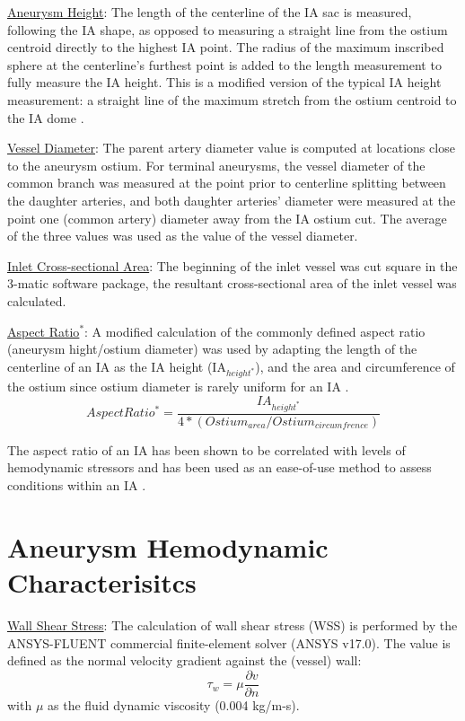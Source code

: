 \underline{Aneurysm Height}: The length of the centerline of the IA sac is measured, following the IA shape, as opposed to measuring a straight line from the ostium centroid directly to the highest IA point. The radius of the maximum inscribed sphere at the centerline's furthest point is added to the length measurement to fully measure the IA height. This is a modified version of the typical IA height measurement: a straight line of the maximum stretch from the ostium centroid to the IA dome \cite{ma2010size,duan2018morphological}. 

\underline{Vessel Diameter}: The parent artery diameter value is computed at locations close to the aneurysm ostium. For terminal aneurysms, the vessel diameter of the common branch was measured at the point prior to centerline splitting between the daughter arteries, and both daughter arteries' diameter were measured at the point one (common artery) diameter away from the IA ostium cut. The average of the three values was used as the value of the vessel diameter.

\underline{Inlet Cross-sectional Area}: The beginning of the inlet vessel was cut square in the 3-matic software package, the resultant cross-sectional area of the inlet vessel was calculated. 
 
\underline{Aspect Ratio$^*$}: A modified calculation of the commonly defined aspect ratio (aneurysm hight/ostium diameter) was used by adapting the length of the centerline of an IA as the IA height (IA$_{height^*}$), and the area and circumference of the ostium since ostium diameter is rarely uniform for an IA \cite{piccinelli2012characterization}.
\begin{equation}
Aspect Ratio^* = \frac{IA_{height^*}}{4*(Ostium_{area} / Ostium_{circumfrence})}
\end{equation}

The aspect ratio of an IA has been shown to be correlated with levels of hemodynamic stressors and has been used as an ease-of-use method to assess conditions within an IA \cite{zeng2011can}.  

\section{Aneurysm Hemodynamic Characterisitcs}\label{CHAPTER1_SECTION3}


\underline{Wall Shear Stress}: 
The calculation of wall shear stress (WSS) is performed by the ANSYS-FLUENT commercial finite-element solver (ANSYS v17.0). The value is defined as the normal velocity gradient against the (vessel) wall:
\begin{equation} \label{WSS}
\tau_w = \mu\frac{\partial v}{\partial n}
\end{equation}
with $\mu$ as the fluid dynamic viscosity (0.004 kg/m-s). 

